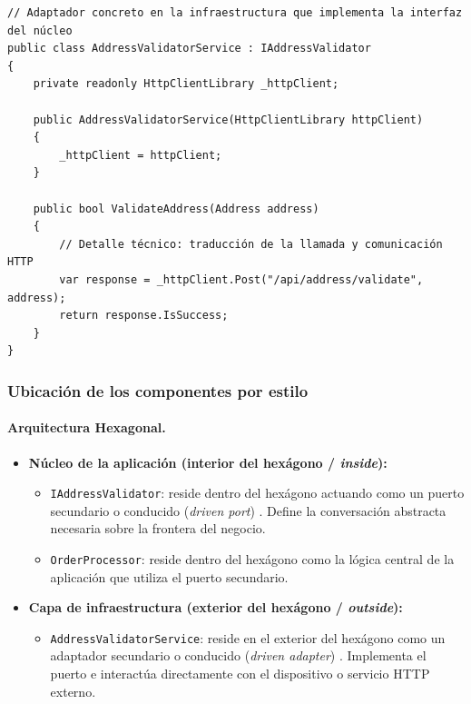 \begin{lstlisting}[caption={Adaptador \texttt{AddressValidatorService} en la infraestructura}, label=lst:p4-adaptador]
// Adaptador concreto en la infraestructura que implementa la interfaz del núcleo
public class AddressValidatorService : IAddressValidator
{
    private readonly HttpClientLibrary _httpClient;

    public AddressValidatorService(HttpClientLibrary httpClient)
    {
        _httpClient = httpClient;
    }

    public bool ValidateAddress(Address address)
    {
        // Detalle técnico: traducción de la llamada y comunicación HTTP
        var response = _httpClient.Post("/api/address/validate", address);
        return response.IsSuccess;
    }
}
\end{lstlisting}

\subsubsection*{Ubicación de los componentes por estilo}

\paragraph{Arquitectura Hexagonal.}
\begin{itemize}
    \item \textbf{Núcleo de la aplicación (interior del hexágono / \emph{inside}):}
    \begin{itemize}
        \item \texttt{IAddressValidator}: reside dentro del hexágono actuando como un puerto secundario o conducido (\emph{driven port}) \parencite{cockburn2005}. Define la conversación abstracta necesaria sobre la frontera del negocio.
        \item \texttt{OrderProcessor}: reside dentro del hexágono como la lógica central de la aplicación que utiliza el puerto secundario.
    \end{itemize}
    \item \textbf{Capa de infraestructura (exterior del hexágono / \emph{outside}):}
    \begin{itemize}
        \item \texttt{AddressValidatorService}: reside en el exterior del hexágono como un adaptador secundario o conducido (\emph{driven adapter}) \parencite{cockburn2005}. Implementa el puerto e interactúa directamente con el dispositivo o servicio HTTP externo.
    \end{itemize}
\end{itemize}

